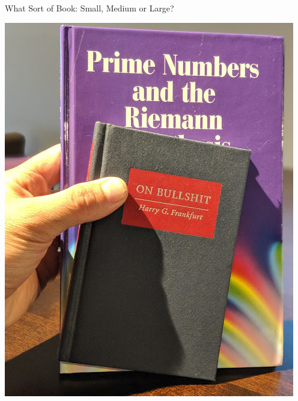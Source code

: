 \documentclass{beamer}
\begin{document}
\begin{frame}{What Sort of Book: Small, Medium or Large?}
\begin{center}
    \includegraphics[height=.75\textheight]{pics/bullshit}
  \end{center}
\end{frame}
\end{document}
